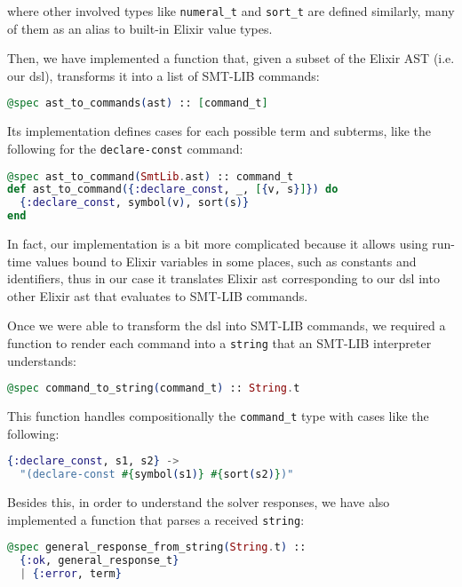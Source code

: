 where other involved types like \verb|numeral_t| and \verb|sort_t| are defined 
similarly, many of them as an alias to built-in Elixir value types.

Then, we have implemented a function that, given a subset of the Elixir AST
(i.e. our \gls{dsl}), transforms it into a list of SMT-LIB commands:

\begin{lstlisting}[language=elixir,numbers=none,frame=none]
@spec ast_to_commands(ast) :: [command_t]
\end{lstlisting}

Its implementation defines cases for each possible term and subterms, like the
following for the \verb|declare-const| command:

\begin{lstlisting}[language=elixir,numbers=none,frame=none]
@spec ast_to_command(SmtLib.ast) :: command_t
def ast_to_command({:declare_const, _, [{v, s}]}) do
  {:declare_const, symbol(v), sort(s)}
end
\end{lstlisting}

In fact, our implementation is a bit more complicated because it allows using 
run-time values bound to Elixir variables in some places, such as constants and
identifiers, thus in our case it translates Elixir \gls{ast} corresponding to
our \gls{dsl} into other Elixir \gls{ast} that evaluates to SMT-LIB commands.

Once we were able to transform the \gls{dsl} into SMT-LIB commands, we required
a function to render each command into a \verb|string| that an SMT-LIB
interpreter understands:

\begin{lstlisting}[language=elixir,numbers=none,frame=none]
@spec command_to_string(command_t) :: String.t
\end{lstlisting}

This function handles compositionally the \verb|command_t| type with cases like
the following:

\begin{lstlisting}[language=elixir,numbers=none,frame=none]
{:declare_const, s1, s2} ->
  "(declare-const #{symbol(s1)} #{sort(s2)})"
\end{lstlisting}

Besides this, in order to understand the solver responses, we have also
implemented a function that parses a received \verb|string|:

\begin{lstlisting}[language=elixir,numbers=none,frame=none]
@spec general_response_from_string(String.t) :: 
  {:ok, general_response_t} 
  | {:error, term}
\end{lstlisting}

